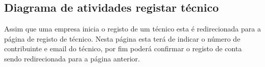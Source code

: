 







\newpage

\subsection{Diagrama de atividades registar técnico}

Assim que uma empresa inicia o registo de um técnico esta é redirecionada para a página de registo de técnico.
Nesta página esta terá de indicar o número de contribuinte e email do técnico, por fim poderá confirmar o registo
de conta sendo redirecionada para a página anterior.

